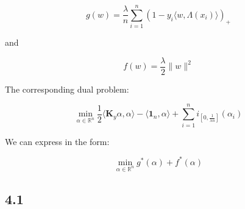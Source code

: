 \documentclass[12pt]{article}
\begin{document}
\[g(w) = \frac{\lambda}{n} \sum_{i=1}^{n} (1-y_i \langle w, \Lambda(x_i)\rangle)_{+}\]

and

\[f(w) = \frac{\lambda}{2}\| w\|^2\]

The corresponding dual problem:

\[\min_{\alpha \in \mathbb{R}^n} \frac{1}{2} \langle \mathbf{K}_y \alpha, \alpha \rangle - \langle \textbf{1}_n, \alpha\rangle + \sum_{i=1}^{n} i_{\left[0, \frac{1}{\lambda n}\right]}(\alpha_i)\]


We can express in the form:

\[\min_{\alpha \in \mathbb{R}^n} g^*(\alpha) + f^*(\alpha)\]


\subsection*{4.1}
\end{document}
